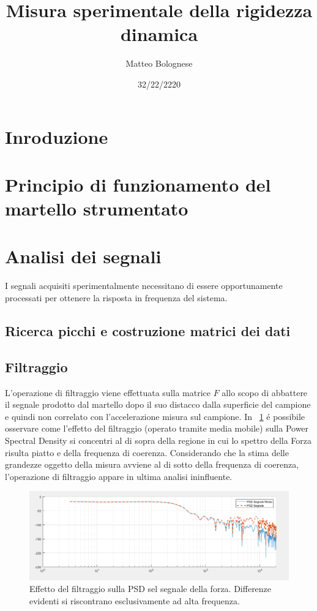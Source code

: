 \documentclass[12pt,a4paper]{article}
\begin{document}
 	\title{Misura sperimentale della rigidezza dinamica} \author{Matteo Bolognese}
 	\date{32/22/2220}
 	\maketitle
	
 \section{Inroduzione}
 
 \section{Principio di funzionamento del martello strumentato}

 \section{Analisi dei segnali}
 I segnali acquisiti sperimentalmente necessitano di essere opportunamente processati per ottenere la risposta in frequenza del sistema.
 \subsection{Ricerca picchi e costruzione matrici dei dati}
 
 \subsection{Filtraggio}
 L'operazione di filtraggio viene effettuata sulla matrice $F$ allo scopo di abbattere il segnale prodotto dal martello dopo il suo distacco dalla superficie del campione e quindi non correlato con l'accelerazione misura sul campione. In \figurename~\ref{fig:Effettofiltraggio} \'e possibile osservare come l'effetto del filtraggio (operato tramite media mobile) sulla Power Spectral Density si concentri al di sopra della regione in cui lo spettro della Forza risulta piatto e della frequenza di coerenza. Considerando che la stima delle grandezze oggetto della misura avviene al di sotto della frequenza di coerenza, l'operazione di filtraggio  appare in ultima analisi ininfluente.
 \begin{figure}
	\centering
	\includegraphics[width=14cm]{Effettofiltraggio}
	\caption{Effetto del filtraggio sulla PSD sel segnale della forza. Differenze evidenti si riscontrano esclusivamente ad alta frequenza.}
	\label{fig:Effettofiltraggio}
 \end{figure}
\end{document}
